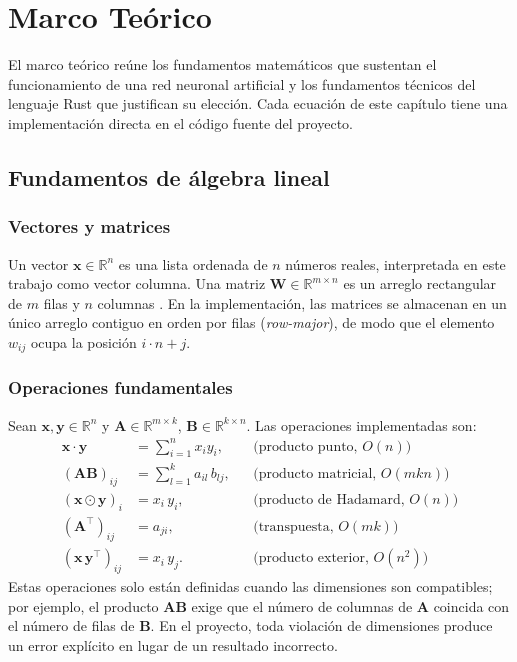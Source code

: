 \chapter{Marco Teórico}\label{cap:marco}
El marco teórico reúne los fundamentos matemáticos que sustentan el funcionamiento de una red neuronal artificial y los fundamentos técnicos del lenguaje Rust que justifican su elección. Cada ecuación de este capítulo tiene una implementación directa en el código fuente del proyecto.

\section{Fundamentos de álgebra lineal}
\subsection{Vectores y matrices}
Un vector $\mathbf{x}\in\mathbb{R}^{n}$ es una lista ordenada de $n$ números reales, interpretada en este trabajo como vector columna. Una matriz $\mathbf{W}\in\mathbb{R}^{m\times n}$ es un arreglo rectangular de $m$ filas y $n$ columnas \citep{strang2016}. En la implementación, las matrices se almacenan en un único arreglo contiguo en orden por filas (\emph{row-major}), de modo que el elemento $w_{ij}$ ocupa la posición $i\cdot n + j$.

\subsection{Operaciones fundamentales}
Sean $\mathbf{x},\mathbf{y}\in\mathbb{R}^{n}$ y $\mathbf{A}\in\mathbb{R}^{m\times k}$, $\mathbf{B}\in\mathbb{R}^{k\times n}$. Las operaciones implementadas son:
\begin{align}
\mathbf{x}\cdot\mathbf{y} &= \sum_{i=1}^{n} x_i y_i, &&\text{(producto punto, } O(n)\text{)}\label{eq:dot}\\
(\mathbf{A}\mathbf{B})_{ij} &= \sum_{l=1}^{k} a_{il}\, b_{lj}, &&\text{(producto matricial, } O(mkn)\text{)}\label{eq:matmul}\\
(\mathbf{x}\odot\mathbf{y})_i &= x_i\, y_i, &&\text{(producto de Hadamard, } O(n)\text{)}\label{eq:hadamard}\\
(\mathbf{A}^{\top})_{ij} &= a_{ji}, &&\text{(transpuesta, } O(mk)\text{)}\label{eq:transpuesta}\\
(\mathbf{x}\,\mathbf{y}^{\top})_{ij} &= x_i\, y_j. &&\text{(producto exterior, } O(n^2)\text{)}\label{eq:outer}
\end{align}
Estas operaciones solo están definidas cuando las dimensiones son compatibles; por ejemplo, el producto $\mathbf{A}\mathbf{B}$ exige que el número de columnas de $\mathbf{A}$ coincida con el número de filas de $\mathbf{B}$. En el proyecto, toda violación de dimensiones produce un error explícito en lugar de un resultado incorrecto.

